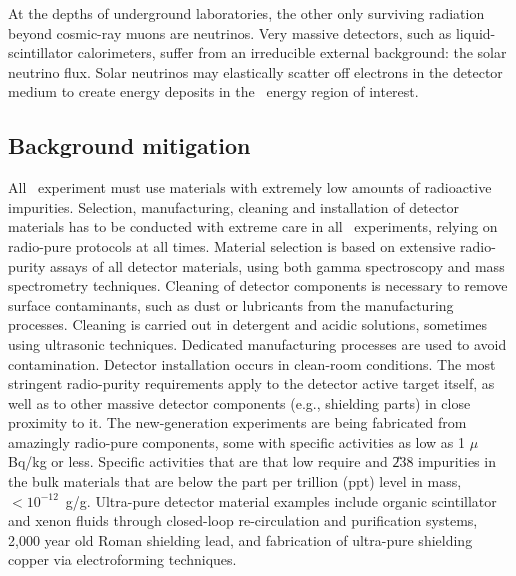 At the depths of underground laboratories, the other only surviving radiation beyond cosmic-ray muons are neutrinos. Very massive detectors, such as liquid-scintillator calorimeters, suffer from an irreducible external background: the solar neutrino flux. Solar neutrinos may elastically scatter off electrons in the detector medium to create energy deposits in the \bbonu\ energy region of interest.


\subsection{Background mitigation} \label{subsec:bgrmitigation}

%

All \bbonu\ experiment must use materials with extremely low amounts of radioactive impurities. Selection, manufacturing, cleaning and installation of detector materials has to be conducted with extreme care in all \bbonu\ experiments, relying on radio-pure protocols at all times. Material selection is based on extensive radio-purity assays of all detector materials, using both gamma spectroscopy and mass spectrometry techniques. Cleaning of detector components is necessary to remove surface contaminants, such as dust or lubricants from the manufacturing processes. Cleaning is carried out in detergent and acidic solutions, sometimes using ultrasonic techniques. Dedicated manufacturing processes are used to avoid contamination. Detector installation occurs in clean-room conditions. The most stringent radio-purity requirements apply to the detector active target itself, as well as to other massive detector components (e.g., shielding parts) in close proximity to it. The new-generation experiments are being fabricated from amazingly radio-pure components, some with specific activities as low as 1 $\mu$Bq/kg or less. Specific activities that are that low require  and \U{238} impurities in the bulk materials that are below the part per trillion (ppt) level in mass, $<10^{-12}$~g/g. Ultra-pure detector material examples include organic scintillator and xenon fluids through closed-loop re-circulation and purification systems, 2,000 year old Roman shielding lead, and fabrication of ultra-pure shielding copper via electroforming techniques.

